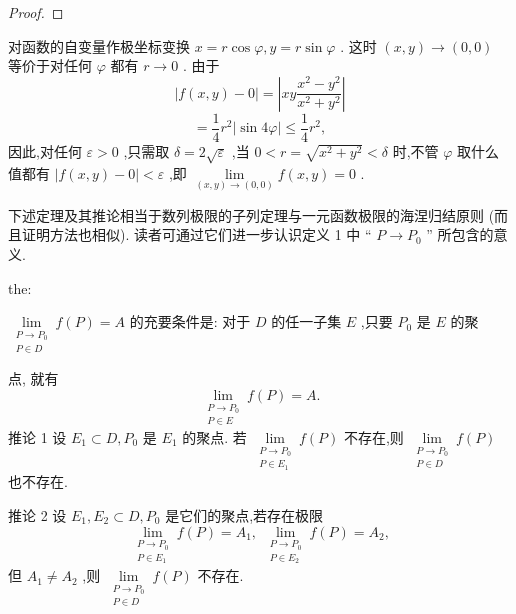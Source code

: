 \begin{proof}

\end{proof}
对函数的自变量作极坐标变换 \(x = r\cos \varphi ,y = r\sin \varphi\) . 这时 \(\left( {x,y}\right)  \rightarrow  \left( {0,0}\right)\) 等价于对任何 \(\varphi\) 都有 \(r \rightarrow  0\) . 由于
\[
\left| {f\left( {x,y}\right)  - 0}\right|  = \left| {{xy}\frac{{x}^{2} - {y}^{2}}{{x}^{2} + {y}^{2}}}\right|
\]
\[
= \frac{1}{4}{r}^{2}\left| {\sin {4\varphi }}\right|  \leq  \frac{1}{4}{r}^{2},
\]
因此,对任何 \(\varepsilon  > 0\) ,只需取 \(\delta  = 2\sqrt{\varepsilon }\) ,当 \(0 < r = \sqrt{{x}^{2} + {y}^{2}} < \delta\) 时,不管 \(\varphi\) 取什么值都有 \(\left| {f\left( {x,y}\right)  - 0}\right|  < \varepsilon\) ,即 \(\mathop{\lim }\limits_{{\left( {x,y}\right)  \rightarrow  \left( {0,0}\right) }}f\left( {x,y}\right)  = 0\) .

下述定理及其推论相当于数列极限的子列定理与一元函数极限的海涅归结原则 (而且证明方法也相似). 读者可通过它们进一步认识定义 1 中 “ \(P \rightarrow  {P}_{0}\) ” 所包含的意义.

\begin{theorem}{}{the:}

\end{theorem}
 \(\mathop{\lim }\limits_{\substack{{P \rightarrow  {P}_{0}} \\  {P \in  D} }}f\left( P\right)  = A\) 的充要条件是: 对于 \(D\) 的任一子集 \(E\) ,只要 \({P}_{0}\) 是 \(E\) 的聚

点, 就有
\[
\mathop{\lim }\limits_{\substack{{P \rightarrow  {P}_{0}} \\  {P \in  E} }}f\left( P\right)  = A.
\]
推论 1 设 \({E}_{1} \subset  D,{P}_{0}\) 是 \({E}_{1}\) 的聚点. 若 \(\mathop{\lim }\limits_{\substack{{P \rightarrow  {P}_{0}} \\  {P \in  {E}_{1}} }}f\left( P\right)\) 不存在,则 \(\mathop{\lim }\limits_{\substack{{P \rightarrow  {P}_{0}} \\  {P \in  D} }}f\left( P\right)\) 也不存在.

推论 2 设 \({E}_{1},{E}_{2} \subset  D,{P}_{0}\) 是它们的聚点,若存在极限
\[
\mathop{\lim }\limits_{\substack{{P \rightarrow  {P}_{0}} \\  {P \in  {E}_{1}} }}f\left( P\right)  = {A}_{1},\;\mathop{\lim }\limits_{\substack{{P \rightarrow  {P}_{0}} \\  {P \in  {E}_{2}} }}f\left( P\right)  = {A}_{2},
\]
但 \({A}_{1} \neq  {A}_{2}\) ,则 \(\mathop{\lim }\limits_{\substack{{P \rightarrow  {P}_{0}} \\  {P \in  D} }}f\left( P\right)\) 不存在.

